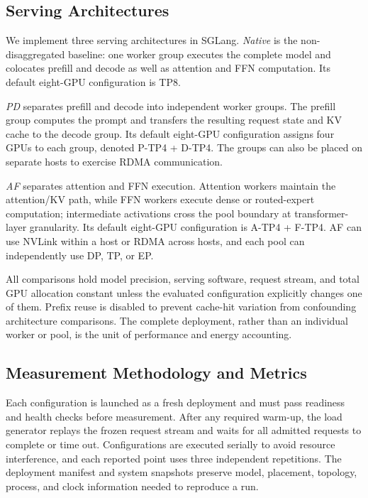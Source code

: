 \subsection{Serving Architectures}
\label{sec:architectures}

We implement three serving architectures in SGLang. \emph{Native} is the non-disaggregated baseline: one worker group executes the complete model and colocates prefill and decode as well as attention and FFN computation. Its default eight-GPU configuration is TP8.

\emph{PD} separates prefill and decode into independent worker groups. The prefill group computes the prompt and transfers the resulting request state and KV cache to the decode group. Its default eight-GPU configuration assigns four GPUs to each group, denoted P-TP4 + D-TP4. The groups can also be placed on separate hosts to exercise RDMA communication.

\emph{AF} separates attention and FFN execution. Attention workers maintain the attention/KV path, while FFN workers execute dense or routed-expert computation; intermediate activations cross the pool boundary at transformer-layer granularity. Its default eight-GPU configuration is A-TP4 + F-TP4. AF can use NVLink within a host or RDMA across hosts, and each pool can independently use DP, TP, or EP.

All comparisons hold model precision, serving software, request stream, and total GPU allocation constant unless the evaluated configuration explicitly changes one of them. Prefix reuse is disabled to prevent cache-hit variation from confounding architecture comparisons. The complete deployment, rather than an individual worker or pool, is the unit of performance and energy accounting.

\subsection{Measurement Methodology and Metrics}
\label{sec:metrics}

Each configuration is launched as a fresh deployment and must pass readiness and health checks before measurement. After any required warm-up, the load generator replays the frozen request stream and waits for all admitted requests to complete or time out. Configurations are executed serially to avoid resource interference, and each reported point uses three independent repetitions. The deployment manifest and system snapshots preserve model, placement, topology, process, and clock information needed to reproduce a run.


